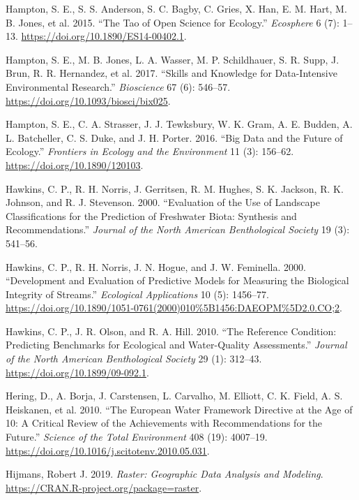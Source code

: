 \documentclass[fleqn,10pt,lineno]{wlpeerj} %
\begin{document}
\leavevmode\hypertarget{ref-Hampton15}{}%
Hampton, S. E., S. S. Anderson, S. C. Bagby, C. Gries, X. Han, E. M. Hart, M. B. Jones, et al. 2015. ``The Tao of Open Science for Ecology.'' \emph{Ecosphere} 6 (7): 1--13. \url{https://doi.org/10.1890/ES14-00402.1}.

\leavevmode\hypertarget{ref-Hampton17}{}%
Hampton, S. E., M. B. Jones, L. A. Wasser, M. P. Schildhauer, S. R. Supp, J. Brun, R. R. Hernandez, et al. 2017. ``Skills and Knowledge for Data-Intensive Environmental Research.'' \emph{Bioscience} 67 (6): 546--57. \url{https://doi.org/10.1093/biosci/bix025}.

\leavevmode\hypertarget{ref-Hampton16}{}%
Hampton, S. E., C. A. Strasser, J. J. Tewksbury, W. K. Gram, A. E. Budden, A. L. Batcheller, C. S. Duke, and J. H. Porter. 2016. ``Big Data and the Future of Ecology.'' \emph{Frontiers in Ecology and the Environment} 11 (3): 156--62. \url{https://doi.org/10.1890/120103}.

\leavevmode\hypertarget{ref-Hawkins00}{}%
Hawkins, C. P., R. H. Norris, J. Gerritsen, R. M. Hughes, S. K. Jackson, R. K. Johnson, and R. J. Stevenson. 2000. ``Evaluation of the Use of Landscape Classifications for the Prediction of Freshwater Biota: Synthesis and Recommendations.'' \emph{Journal of the North American Benthological Society} 19 (3): 541--56.

\leavevmode\hypertarget{ref-Hawkins00b}{}%
Hawkins, C. P., R. H. Norris, J. N. Hogue, and J. W. Feminella. 2000. ``Development and Evaluation of Predictive Models for Measuring the Biological Integrity of Streams.'' \emph{Ecological Applications} 10 (5): 1456--77. \url{https://doi.org/10.1890/1051-0761(2000)010\%5B1456:DAEOPM\%5D2.0.CO;2}.

\leavevmode\hypertarget{ref-Hawkins10}{}%
Hawkins, C. P., J. R. Olson, and R. A. Hill. 2010. ``The Reference Condition: Predicting Benchmarks for Ecological and Water-Quality Assessments.'' \emph{Journal of the North American Benthological Society} 29 (1): 312--43. \url{https://doi.org/10.1899/09-092.1}.

\leavevmode\hypertarget{ref-Hering10}{}%
Hering, D., A. Borja, J. Carstensen, L. Carvalho, M. Elliott, C. K. Field, A. S. Heiskanen, et al. 2010. ``The European Water Framework Directive at the Age of 10: A Critical Review of the Achievements with Recommendations for the Future.'' \emph{Science of the Total Environment} 408 (19): 4007--19. \url{https://doi.org/10.1016/j.scitotenv.2010.05.031}.

\leavevmode\hypertarget{ref-Hijmans19}{}%
Hijmans, Robert J. 2019. \emph{Raster: Geographic Data Analysis and Modeling}. \url{https://CRAN.R-project.org/package=raster}.
\end{document}
